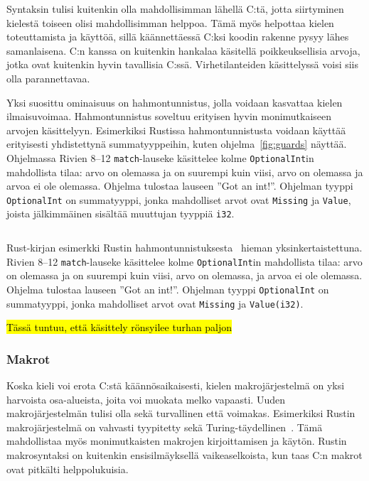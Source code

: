Syntaksin tulisi kuitenkin olla mahdollisimman lähellä C:tä, jotta siirtyminen
kielestä toiseen olisi mahdollisimman helppoa. Tämä myös helpottaa kielen
toteuttamista ja käyttöä, sillä käännettäessä C:ksi koodin rakenne pysyy lähes
samanlaisena. C:n kanssa on kuitenkin hankalaa käsitellä poikkeuksellisia
arvoja, jotka ovat kuitenkin hyvin tavallisia C:ssä. Virhetilanteiden
käsittelyssä voisi siis olla parannettavaa.

\newpage

Yksi suosittu ominaisuus on hahmontunnistus, jolla
voidaan kasvattaa kielen ilmaisuvoimaa. Hahmontunnistus soveltuu erityisen
hyvin monimutkaiseen arvojen käsittelyyn. Esimerkiksi Rustissa
hahmontunnistusta voidaan käyttää erityisesti yhdistettynä summatyyppeihin,
kuten ohjelma~\ref{fig:guards} näyttää. Ohjelmassa Rivien 8--12
\texttt{match}-lauseke käsittelee kolme \texttt{OptionalInt}in mahdollista
tilaa: arvo on olemassa ja on suurempi kuin viisi, arvo on olemassa ja arvoa
ei ole olemassa. Ohjelma tulostaa lauseen ''Got an int!''. Ohjelman tyyppi
\texttt{OptionalInt} on summatyyppi, jonka mahdolliset arvot ovat
\texttt{Missing} ja \texttt{Value}, joista jälkimmäinen sisältää muuttujan
tyyppiä \texttt{i32}.

\FloatBarrier

\begin{listing}[ht!]
    \inputminted{Rust}{guards.rs}
    \caption{Rust-kirjan esimerkki Rustin
    hahmontunnistuksesta~\citep{rustguards} hieman yksinkertaistettuna. Rivien
    8--12 \texttt{match}-lauseke käsittelee kolme \texttt{OptionalInt}in
    mahdollista tilaa: arvo on olemassa ja on suurempi kuin viisi, arvo on
    olemassa, ja arvoa ei ole olemassa. Ohjelma tulostaa lauseen ''Got an
    int!''. Ohjelman tyyppi \texttt{OptionalInt} on summatyyppi, jonka
    mahdolliset arvot ovat \texttt{Missing} ja \texttt{Value(i32)}.}
    \label{fig:guards}
\end{listing}

\FloatBarrier

\hl{Tässä tuntuu, että käsittely rönsyilee turhan paljon}

\subsubsection{Makrot}

Koska kieli voi erota C:stä käännösaikaisesti, kielen makrojärjestelmä on yksi
harvoista osa-alueista, joita voi muokata melko vapaasti. Uuden
makrojärjestelmän tulisi olla sekä turvallinen että voimakas. Esimerkiksi
Rustin makrojärjestelmä on vahvasti tyypitetty sekä
Turing-täydellinen~\citep{rustmacros}. Tämä mahdollistaa myös monimutkaisten
makrojen kirjoittamisen ja käytön. Rustin makrosyntaksi on kuitenkin
ensisilmäyksellä vaikeaselkoista, kun taas C:n makrot ovat pitkälti
helppolukuisia.

